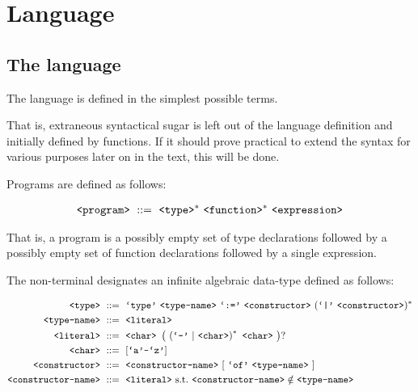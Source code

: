 \chapter{Language}

\section{The language }

The language  is defined in the simplest possible terms.

That is,
extraneous syntactical sugar is left out of the language definition and
initially defined by functions. If it should prove practical to extend the
syntax for various purposes later on in the text, this will be done.

\newcommand{\mathmono}[1]{\ensuremath{\text{\mono{#1}}}}
\newcommand{\nonterm}[1]{\ensuremath{\text{\mono{<#1>}}}}
\newcommand{\term}[1]{\ensuremath{\text{\mono{`#1'}}}}

Programs are defined as follows:

\begin{align}
\nonterm{program}\ &::=\ \nonterm{type}^*\ \nonterm{function}^*
\ \nonterm{expression}\\
\end{align}

That is, a program is a possibly empty set of type declarations followed by a
possibly empty set of function declarations followed by a single expression.

The non-terminal  designates an infinite algebraic data-type
defined as follows:

\begin{align}
\nonterm{type}\ &::=\ \term{type}\ \nonterm{type-name}
\ \term{:=}\ \nonterm{constructor}\ (\term{|}
\ \nonterm{constructor})^*\\
\nonterm{type-name}\ &::=\ \nonterm{literal}\\
\nonterm{literal}\ &::=\ \nonterm{char}
\ \left (\ \left (\term{-}\ |\ \nonterm{char}\right )^*
\ \nonterm{char}\ \right )?\\
\nonterm{char}\ &::=\ [\term{a}\mathmono{-}\term{z}]\\
\nonterm{constructor}\ &::=\ \nonterm{constructor-name}
\ [\ \term{of}\ \nonterm{type-name}\ ]\\
\nonterm{constructor-name}\ &::=\ \nonterm{literal}\ \text{s.t.}
\ \nonterm{constructor-name}\notin \nonterm{type-name}
\end{align}



